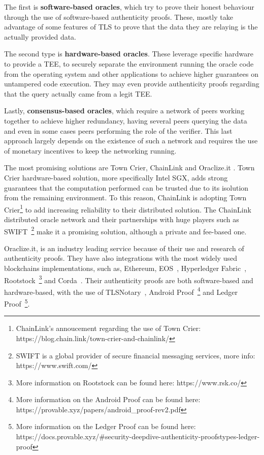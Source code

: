 The first is \textbf{software-based oracles}, which try to prove their honest behaviour through the use of software-based authenticity proofs. These, mostly take advantage of some features of TLS to prove that the data they are relaying is the actually provided data.

The second type is \textbf{hardware-based oracles}. These leverage specific hardware to provide a TEE, to securely separate the environment running the oracle code from the operating system and other applications to achieve higher guarantees on untampered code execution. They may even provide authenticity proofs regarding that the query actually came from a legit TEE.

Lastly, \textbf{consensus-based oracles}, which require a network of peers working together to achieve higher redundancy, having several peers querying the data and even in some cases peers performing the role of the verifier. This last approach largely depends on the existence of such a network and requires the use of monetary incentives to keep the networking running.

The most promising solutions are Town Crier, ChainLink and Oraclize.it .  Town Crier hardware-based solution, more specifically Intel SGX, adds strong guarantees that the computation performed can be trusted due to its isolution from the remaining environment. To this reason, ChainLink is adopting Town Crier\footnote{ChainLink's annoucement regarding the use of Town Crier: https://blog.chain.link/town-crier-and-chainlink/} to add increasing reliability to their distributed solution. The ChainLink distributed oracle network and their partnerships with huge players such as SWIFT~\footnote{SWIFT is a global provider
  of secure financial messaging services, more info: https://www.swift.com/} make it a promising solution, although a private and fee-based one.

Oraclize.it, is an industry leading service because of their use and research of authenticity proofs. They have also integrations with the most widely used blockchains implementations, such as, Ethereum, EOS~\cite{Block.one2018}, Hyperledger Fabric~\cite{Androulaki}, Rootstock~\footnote{More information on Rootstock can be found here: https://www.rsk.co/} and Corda~\cite{Brown2016}. Their authenticity proofs are both software-based and hardware-based, with the use of TLSNotary~\cite{TLSnotary}, Android Proof~\footnote{More information on the Android Proof can be found here: https://provable.xyz/papers/android\_proof-rev2.pdf} and Ledger Proof~\footnote{More information on the Ledger Proof can be found here: https://docs.provable.xyz/\#security-deepdive-authenticity-proofstypes-ledger-proof}.

